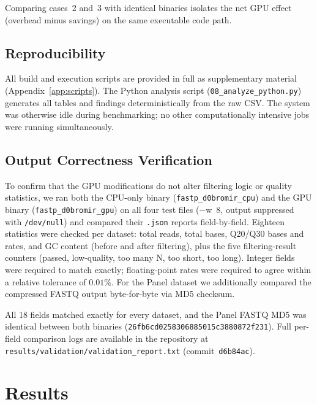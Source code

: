 \documentclass[a4paper,12pt]{article}
\begin{document}
Comparing cases~2 and~3 with identical binaries isolates the net GPU effect
(overhead minus savings) on the same executable code path.

\subsection{Reproducibility}

All build and execution scripts are provided in full as supplementary material
(Appendix~\ref{app:scripts}).  The Python analysis script
(\texttt{08\_analyze\_python.py}) generates all tables and findings
deterministically from the raw CSV.  The system was otherwise idle during
benchmarking; no other computationally intensive jobs were running simultaneously.

\subsection{Output Correctness Verification}
\label{sec:correctness}

To confirm that the GPU modifications do not alter filtering logic or quality
statistics, we ran both the CPU-only binary (\texttt{fastp\_d0bromir\_cpu}) and
the GPU binary (\texttt{fastp\_d0bromir\_gpu}) on all four test files
($-$w~8, output suppressed with \texttt{/dev/null}) and compared their
\texttt{.json} reports field-by-field.  Eighteen statistics were checked per
dataset: total reads, total bases, Q20/Q30 bases and rates, and GC content
(before and after filtering), plus the five filtering-result counters (passed,
low-quality, too many N, too short, too long).  Integer fields were required to
match exactly; floating-point rates were required to agree within a relative
tolerance of $0.01\%$.  For the Panel dataset we additionally compared the
compressed FASTQ output byte-for-byte via MD5 checksum.

All 18 fields matched exactly for every dataset, and the Panel FASTQ MD5 was
identical between both binaries
(\texttt{26fb6cd0258306885015c3880872f231}).  Full per-field comparison
logs are available in the repository at
\texttt{results/validation/validation\_report.txt} (commit~\texttt{d6b84ac}).

\section{Results}
\label{sec:results}
\end{document}
